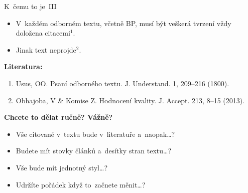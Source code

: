 \documentclass[compress, xelatex, 11pt, xcolor=svgnames, aspectratio=169,
	hyperref={
		bookmarks=true,
		unicode=true,
		colorlinks=true,
		pdftitle={Citacni software},
		plainpages=false,
		pdfauthor={Vojtech Zeisek},
		pdfsubject={Kratky uvod do citacniho software},
		pdfcreator={XeLaTeX},
		pdfkeywords={citace, reference, software, literatura},
		linkcolor=Crimson, %
		anchorcolor=Magenta, %
		citecolor=Magenta, %
		filecolor=Magenta, %
		menucolor=Magenta, %
		urlcolor=DarkTurquoise, %
		},
	url={hyphens, lowtilde} %
	]{beamer}
\begin{document}
\begin{frame}{K~čemu to je~III}
	\begin{itemize}
		\item V~každém odborném textu, včetně BP, musí být veškerá tvrzení vždy doložena citacemi$^{1}$.
		\item Jinak text neprojde$^{2}$.
	\end{itemize}
	\textbf{Literatura:}
	\begin{enumerate}
		\item Usus, OO. Psaní odborného textu. J. Understand. 1, 209--216 (1800).
		\item Obhajoba, V \& Komise Z. Hodnocení kvality. J. Accept. 213, 8--15 (2013).
	\end{enumerate}
	\vfill
	\hrulefill
	\vfill
	\textbf{Chcete to dělat ručně? Vážně?}
	\begin{itemize}
		\item Vše citované v~textu bude v~literatuře a~naopak\ldots?
		\item Budete mít stovky článků a~desítky stran textu\ldots?
		\item Vše bude mít jednotný styl\ldots?
		\item Udržíte pořádek když to~začnete měnit\ldots?
	\end{itemize}
\end{frame}
\end{document}
